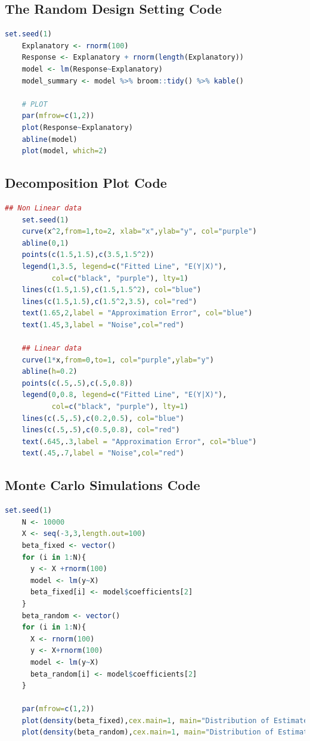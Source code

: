 \documentclass[nohyperref]{article}
\theoremstyle{plain}
\theoremstyle{definition}
\theoremstyle{remark}
\begin{document}
\subsection{The Random Design Setting Code}
\label{code:random}
\begin{lstlisting}[language=R]
    set.seed(1)
    Explanatory <- rnorm(100)
    Response <- Explanatory + rnorm(length(Explanatory))
    model <- lm(Response~Explanatory)
    model_summary <- model %>% broom::tidy() %>% kable()
    
    # PLOT
    par(mfrow=c(1,2))
    plot(Response~Explanatory)
    abline(model)
    plot(model, which=2)
\end{lstlisting}


\subsection{Decomposition Plot Code}
\label{code:decomp}
\begin{lstlisting}[language=R]
    ## Non Linear data
    set.seed(1)
    curve(x^2,from=1,to=2, xlab="x",ylab="y", col="purple")
    abline(0,1)
    points(c(1.5,1.5),c(3.5,1.5^2))
    legend(1,3.5, legend=c("Fitted Line", "E(Y|X)"),
           col=c("black", "purple"), lty=1)
    lines(c(1.5,1.5),c(1.5,1.5^2), col="blue")
    lines(c(1.5,1.5),c(1.5^2,3.5), col="red")
    text(1.65,2,label = "Approximation Error", col="blue")
    text(1.45,3,label = "Noise",col="red")
    
    ## Linear data
    curve(1*x,from=0,to=1, col="purple",ylab="y")
    abline(h=0.2)
    points(c(.5,.5),c(.5,0.8))
    legend(0,0.8, legend=c("Fitted Line", "E(Y|X)"),
           col=c("black", "purple"), lty=1)
    lines(c(.5,.5),c(0.2,0.5), col="blue")
    lines(c(.5,.5),c(0.5,0.8), col="red")
    text(.645,.3,label = "Approximation Error", col="blue")
    text(.45,.7,label = "Noise",col="red")
\end{lstlisting}



\subsection{Monte Carlo Simulations Code}
\label{code:montecarlo}
\begin{lstlisting}[language=R, breaklines=true]
    set.seed(1)
    N <- 10000
    X <- seq(-3,3,length.out=100)
    beta_fixed <- vector()
    for (i in 1:N){
      y <- X +rnorm(100)
      model <- lm(y~X)
      beta_fixed[i] <- model$coefficients[2]
    }
    beta_random <- vector()
    for (i in 1:N){
      X <- rnorm(100)
      y <- X+rnorm(100)
      model <- lm(y~X)
      beta_random[i] <- model$coefficients[2]
    }
    
    par(mfrow=c(1,2))
    plot(density(beta_fixed),cex.main=1, main="Distribution of Estimated Coefficients - Fixed X", xlab = "N=10000")
    plot(density(beta_random),cex.main=1, main="Distribution of Estimated Coefficients - Random X", xlab = "N=10000")
\end{lstlisting}
\end{document}
